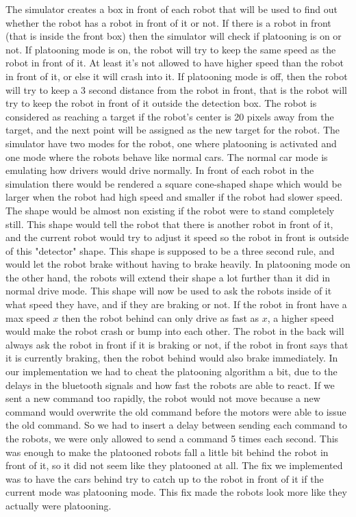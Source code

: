 The simulator creates a box in front of each robot that will be used to find out whether the robot has a robot in front of it or not. If there is a robot in front (that is inside the front box) then the simulator will check if platooning is on or not. If platooning mode is on, the robot will try to keep the same speed as the robot in front of it. At least it's not allowed to have higher speed than the robot in front of it, or else it will crash into it. If platooning mode is off, then the robot will try to keep a 3 second distance from the robot in front, that is the robot will try to keep the robot in front of it outside the detection box. The robot is considered as reaching a target if the robot's center is 20 pixels away from the target, and the next point will be assigned as the new target for the robot.
The simulator have two modes for the robot, one where platooning is activated and one mode where the robots behave like normal cars. The normal car mode is emulating how drivers would drive normally. In front of each robot in the simulation there would be rendered a square cone-shaped shape which would be larger when the robot had high speed and smaller if the robot had slower speed. The shape would be almost non existing if the robot were to stand completely still. This shape would tell the robot that there is another robot in front of it, and the current robot would try to adjust it speed so the robot in front is outside of this "detector" shape. This shape is supposed to be a three second rule, and would let the robot brake without having to brake heavily.
In platooning mode on the other hand, the robots will extend their shape a lot further than it did in normal drive mode. This shape will now be used to ask the robots inside of it what speed they have, and if they are braking or not.
If the robot in front have a max speed $x$ then the robot behind can only drive as fast as $x$, a higher speed would make the robot crash or bump into each other.
The robot in the back will always ask the robot in front if it is braking or not, if the robot in front says that it is currently braking, then the robot behind would also brake immediately.
In our implementation we had to cheat the platooning algorithm a bit, due to the delays in the bluetooth signals and how fast the robots are able to react. If we sent a new command too rapidly, the robot would not move because a new command would overwrite the old command before the motors were able to issue the old command. So we had to insert a delay between sending each command to the robots, we were only allowed to send a command 5 times each second. This was enough to make the platooned robots fall a little bit behind the robot in front of it, so it did not seem like they platooned at all. The fix we implemented was to have the cars behind try to catch up to the robot in front of it if the current mode was platooning mode. This fix made the robots look more like they actually were platooning.

